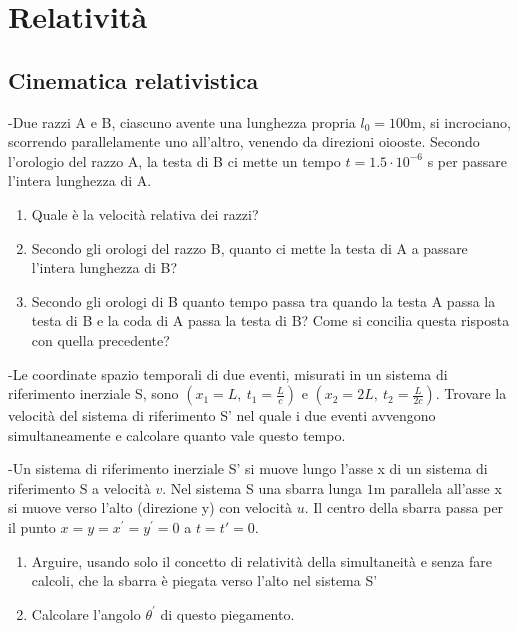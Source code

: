 \documentclass[12pt,twoside,a4]{article}
\begin{document}
\vspace*{\fill} 
\pagestyle{empty}
\vspace*{\fill}
\tableofcontents 
\vspace*{\fill}


\pagestyle{thesis}
\section{Relatività }
\subsection{Cinematica relativistica}

\begin{esercizio}
	-Due razzi A e B, ciascuno avente una lunghezza propria $l_0 = 100$m, si incrociano, scorrendo parallelamente uno all'altro, venendo da direzioni oiooste. Secondo l'orologio del razzo A, la testa di B ci mette un tempo $t = 1.5 \cdot 10^{-6}$ s per passare l'intera lunghezza di A.
	\begin{enumerate}[label=(\textit{\roman*})]
		\item Quale è la velocità  relativa dei razzi?
		\item Secondo gli orologi del razzo B, quanto ci mette la testa di A a passare l'intera lunghezza di B?
		\item Secondo gli orologi di B quanto tempo passa tra quando la testa A passa la testa di B e la coda di A passa la testa di B? Come si concilia questa risposta con quella precedente?
	\end{enumerate}
\end{esercizio}

\begin{esercizio}
	-Le coordinate spazio temporali di due eventi, misurati in un sistema di riferimento inerziale S, sono $(x_1=L, \ t_1 = \frac{L}{c})$ e $(x_2=2L,\  t_2 = \frac{L}{2c})$. Trovare la velocità  del sistema di riferimento S' nel quale i due eventi avvengono simultaneamente e calcolare quanto vale questo tempo.
\end{esercizio}

\begin{esercizio}
	-Un sistema di riferimento inerziale S' si muove lungo l'asse x di un sistema di riferimento S a velocità  $v$. Nel sistema S una sbarra lunga $1$m parallela all'asse x si muove verso l'alto (direzione y) con velocità  $u$. Il centro della sbarra passa per il punto $x=y=x^\prime =y^\prime =0$ a $t=t' =0.$
	\begin{enumerate}[label=(\textit{\roman*})]
		\item Arguire, usando solo il concetto di relatività  della simultaneità  e senza fare calcoli, che la sbarra è piegata verso l'alto nel sistema S'
		\item Calcolare l'angolo $\theta ^\prime$ di questo piegamento.
	\end{enumerate}
\end{esercizio}
\end{document}
